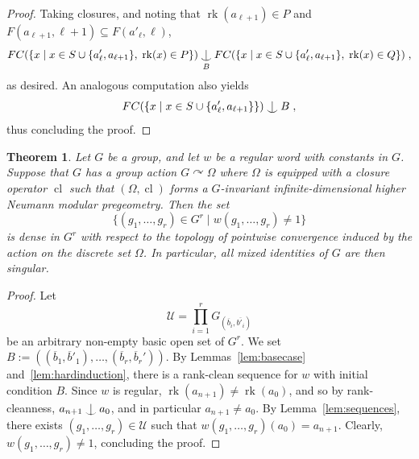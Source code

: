 \documentclass{article}
\newtheorem{theorem}{Theorem}[section]
\theoremstyle{remark}
\theoremstyle{definition}
\def\acts{\curvearrowright}
\newcommand{\remmic}[1]{\textcolor{orange}{MP: #1}}
\newcommand{\repau}[1]{\textcolor{ForestGreen}{PM: #1}}
\DeclareMathOperator{\rk}{rk}
\DeclareMathOperator{\cl}{cl}
\def\Ind#1#2{#1\setbox0=\hbox{$#1x$}\kern\wd0\hbox to 0pt{\hss$#1\mid$\hss}
	\lower.9\ht0\hbox to 0pt{\hss$#1\smile$\hss}\kern\wd0}
\def\ind{\mathop{\mathpalette\Ind{}}}
\begin{document}
{\begin{proof}
Taking %
{closures}, and noting that $\rk(a_{\ell+1})\in P$ and $F(a_{\ell+1}, \ell+1)\subseteq F(a'_\ell, \ell)$, %
\[ FC(\{x\;\vert\; x\in S\cup\{a_\ell',a_{\ell+1}\},\;  \rk(x)\in P\})\ind_B  FC(\{x\;\vert\; x\in S\cup\{a_\ell',a_{\ell+1}\},\;  \rk(x)\in Q\})\;,\]
as desired. 
An analogous computation also yields%
\[FC(\{x\;\vert\; x\in S\cup\{a_\ell',a_{\ell+1}\}\})\ind B\;,\]
thus concluding the proof.
\end{proof}



\begin{theorem}\label{theorem:main} {Let $G$ be a group, and let $w$ be a 
regular word with constants in $G$. %
{Suppose that $G$ has a group action 
$G\acts\Omega$ where $\Omega$ is equipped with a closure operator $\cl$ such that $(\Omega, {\cl})$ forms a $G$-invariant  infinite-dimensional higher Neumann modular pregeometry. %
 Then the set}
\begin{equation}\label{eq:nowheredense}
    \{(g_1, \dots, g_r)\in G^r\;\vert\; w(g_1, \dots, g_r){\neq}  1\}
\end{equation}
  is %
  {dense} in $G^r$ with respect to the topology of pointwise convergence induced by the action on the discrete set $\Omega$. In particular, all mixed identities of $G$ are then singular.}
\end{theorem}
\begin{proof} %
 {Let 
\[\mathcal{U}=\prod_{i=1}^r G_{(\overline{b}_i, \overline{b'_i})}\]
be an arbitrary non-empty basic open set of $G^{{r}}$. We set $B:=((\overline{b}_1, \overline{b}'_1), \dots, (\overline{b}_r, \overline{b}_r'))$. %
 By Lemmas~\ref{lem:basecase} and~\ref{lem:hardinduction}, there is a rank-clean sequence for $w$ with initial condition $B$. Since $w$ is regular, $\rk(a_{n+1})\neq\rk(a_0)$, and so by rank-cleanness, $a_{n+1}\ind a_0$, and in particular $a_{n+1}\neq a_0$. By Lemma~\ref{lem:sequences}, there exists $(g_1, \dots, g_r)\in\mathcal{U}$ such that  $w(g_1, \dots, g_r)(a_0)=a_{n+1}$. Clearly,  $w(g_1, \dots, g_r)\neq 1$, concluding the proof.} 

\end{proof}}
\end{document}
